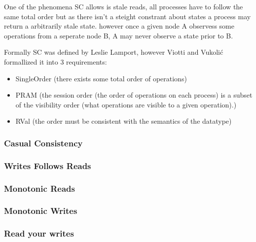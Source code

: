 \documentclass[a4paper,10pt,titlepage]{report}
\begin{document}
    One of the phenomena SC allows is stale reads, all processes have to follow the same total order but as there isn't a steight constrant about states a process may return a arbitrarily stale state. however once a given node A observess some operations from a seperate node B, A may never observe a state prior to B.

    Formally SC was defined by Leslie Lamport\cite{Lamport1979how}, however Viotti and Vukolić\cite{ConsistencyinNonTransactionalDistributedStorageSystems} formallized it into 3 requirements:
    \begin{itemize}
        \item SingleOrder (there exists some total order of operations)
        \item PRAM (the session order (the order of operations on each process) is a subset of the visibility order (what operations are visible to a given operation).)
        \item RVal (the order must be consistent with the semantics of the datatype)
    \end{itemize}


    \subsubsection{Casual Consistency}

    \subsubsection{Writes Follows Reads}

    \subsubsection{Monotonic Reads}

    \subsubsection{Monotonic Writes}

    \subsubsection{Read your writes}
\end{document}
